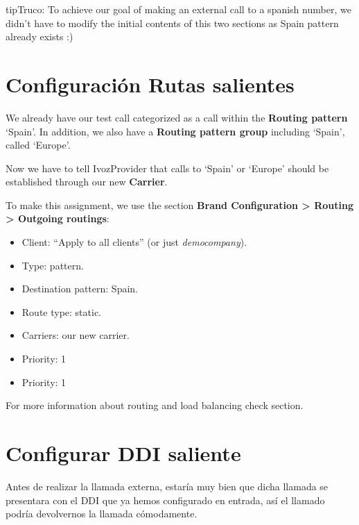 \documentclass[letterpaper,10pt,spanish]{sphinxmanual}
\begin{document}
\begin{notice}{tip}{Truco:}
To achieve our goal of making an external call to a spanish number, we didn't have
to modify the initial contents of this two sections as Spain pattern already exists :)
\end{notice}


\section{Configuración Rutas salientes}
\label{getting_started/external_outgoing_calls/call_routing:outgoing-routing-configuration}\label{getting_started/external_outgoing_calls/call_routing::doc}
We already have our test call categorized as a call within the \textbf{Routing pattern}
`Spain'. In addition, we also have a \textbf{Routing pattern group} including `Spain',
called `Europe'.

Now we have to tell IvozProvider that calls to `Spain' or `Europe' should be
established through our new \textbf{Carrier}.

To make this assignment, we use the section \textbf{Brand Configuration \textgreater{} Routing \textgreater{} Outgoing routings}:
\begin{itemize}
\item {} 
Client: ``Apply to all clients'' (or just \emph{democompany}).

\item {} 
Type: pattern.

\item {} 
Destination pattern: Spain.

\item {} 
Route type: static.

\item {} 
Carriers: our new carrier.

\item {} 
Priority: 1

\item {} 
Priority: 1

\end{itemize}

For more information about routing and load balancing check {\hyperref[administration_portal/brand/routing/outgoing_routings:outgoing\string-routings]{}} section.


\section{Configurar DDI saliente}
\label{getting_started/external_outgoing_calls/outgoing_ddi:external-ddi}\label{getting_started/external_outgoing_calls/outgoing_ddi::doc}\label{getting_started/external_outgoing_calls/outgoing_ddi:outgoing-ddi-configuration}
Antes de realizar la llamada externa, estaría muy bien que dicha llamada se presentara con el DDI que ya hemos configurado en entrada, así el llamado podría devolvernos la llamada cómodamente.
\end{document}

